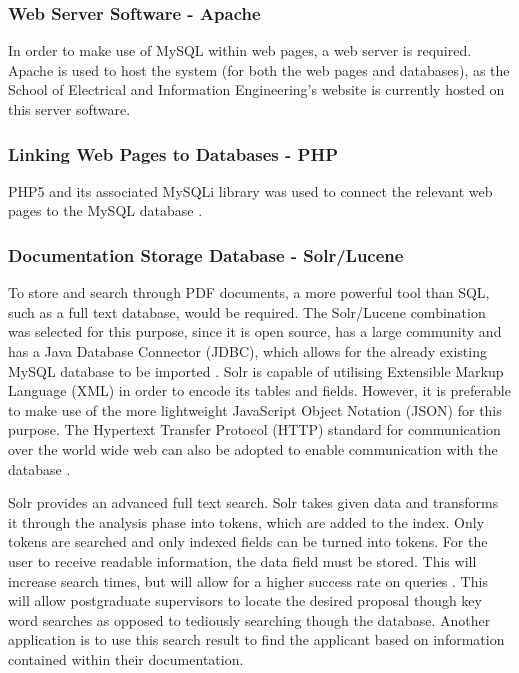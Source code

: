 \documentclass[journal]{IEEEtran}
\begin{document}
\vspace{2mm}

\subsubsection{Web Server Software - Apache}

In order to make use of MySQL within web pages, a web server is required. Apache is used to host the system (for both the web pages and databases), as the School of Electrical and Information Engineering's website is currently hosted on this server software. \vspace{2mm}

\subsubsection{Linking Web Pages to Databases - PHP}

PHP5 and its associated MySQLi library was used to connect the relevant web pages to the MySQL database \cite{phpmysql}. \vspace{2mm}

\subsubsection{Documentation Storage Database - Solr/Lucene}

To store and search through PDF documents, a more powerful tool than SQL, such as a full text database, would be required. The Solr/Lucene combination was selected for this purpose, since it is open source, has a large community and has a Java Database Connector (JDBC), which allows for the already existing MySQL database to be imported \cite{solrjdbc}. Solr is capable of utilising Extensible Markup Language (XML) in order to encode its tables and fields. However, it is preferable to make use of the more lightweight JavaScript Object Notation (JSON) for this purpose. The Hypertext Transfer Protocol (HTTP) standard for communication over the world wide web can also be adopted to enable communication with the database \cite{solrfeature}.

\hfill \break Solr provides an advanced full text search. Solr takes given data and transforms it through the analysis phase into tokens, which are added to the index. Only tokens are searched and only indexed fields can be turned into tokens. For the user to receive readable information, the data field must be stored. This will increase search times, but will allow for a higher success rate on queries \cite{solrsearch}. This will allow postgraduate supervisors to locate the desired proposal though key word searches as opposed to tediously searching though the database. Another application is to use this search result to find the applicant based on information contained within their documentation.
\end{document}

